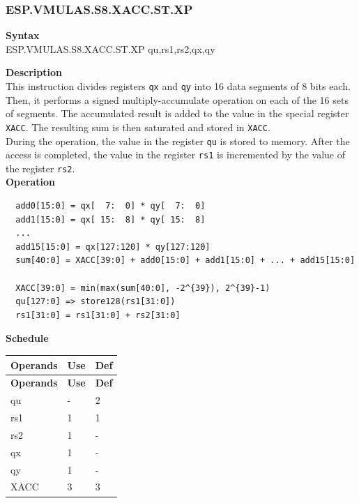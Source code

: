 \newpage
\subsubsection{ESP.VMULAS.S8.XACC.ST.XP}\label{instruction:ESPVMULASS8XACCSTXP}
\textbf{Syntax}\\
ESP.VMULAS.S8.XACC.ST.XP qu,rs1,rs2,qx,qy

\textbf{Description}\\
This instruction divides registers \lstinline{qx} and \lstinline{qy} into 16 data segments of 8 bits each. Then, it performs a signed multiply-accumulate operation on each of the 16 sets of segments. The accumulated result is added to the value in the special register \lstinline{XACC}. The resulting sum is then saturated and stored in \lstinline{XACC}. \\ During the operation, the value in the register \lstinline{qu} is stored to memory. After the access is completed, the value in the register \lstinline{rs1} is incremented by the value of the register \lstinline{rs2}.\\
\textbf{Operation}
\begin{lstlisting}
  add0[15:0] = qx[  7:  0] * qy[  7:  0]
  add1[15:0] = qx[ 15:  8] * qy[ 15:  8]
  ...
  add15[15:0] = qx[127:120] * qy[127:120]
  sum[40:0] = XACC[39:0] + add0[15:0] + add1[15:0] + ... + add15[15:0]

  XACC[39:0] = min(max(sum[40:0], -2^{39}), 2^{39}-1)
  qu[127:0] => store128(rs1[31:0])
  rs1[31:0] = rs1[31:0] + rs2[31:0]
\end{lstlisting}

\textbf{Schedule}\\
\begin{longtable}[c]{|l|l|l|}
    \hline
    \rowcolor{lightgray}
    \textbf{Operands} & \textbf{Use} & \textbf{Def} \\\hline
    \endfirsthead
    \hline
    \rowcolor{lightgray}
     \textbf{Operands} & \textbf{Use} & \textbf{Def} \\\hline
    \endhead
    \hline
    \endfoot

    qu & - & 2 \\\hline
    rs1 & 1 & 1 \\\hline
    rs2 & 1 & - \\\hline
     qx & 1 & - \\\hline
     qy & 1 & - \\\hline
     XACC & 3 & 3

\end{longtable}

